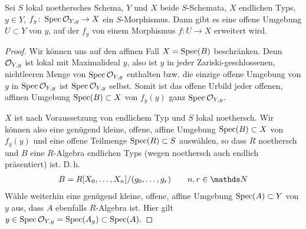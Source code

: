 \documentclass[german]{scrreprt}
\begin{document}
\begin{Lemma}\label{thm:morphismuserweiterung}
  Sei $S$ lokal noethersches Schema,
  $Y$ und $X$ beide $S$-Schemata,
  $X$ endlichen Typs,
  $y\in Y$,
  $f_y\colon \operatorname{Spec}\mathcal{O}_{Y,y}\to X$ ein $S$-Morphismus.
  Dann gibt es eine offene Umgebung $U\subset Y$ von $y$, auf der
  $f_y$ von einem Morphismus $f\colon U\to X$ erweitert wird.
  \begin{proof}
    Wir können uns auf den affinen Fall $X=\operatorname{Spec}(B)$ beschränken.
    Denn $\mathcal{O}_{Y,y}$ ist lokal mit Maximalideal $y$, also ist $y$ in
    jeder Zariski-geschlossenen, nichtleeren Menge von $\operatorname{Spec}\mathcal{O}_{Y,y}$
    enthalten bzw. die einzige offene Umgebung von $y$ in
    $\operatorname{Spec}\mathcal{O}_{Y,y}$ ist $\operatorname{Spec}\mathcal{O}_{Y,y}$ selbst.
    Somit ist das offene Urbild jeder offenen, affinen Umgebung
    $\operatorname{Spec}(B)\subset X$ von $f_y(y)$ ganz $\operatorname{Spec}\mathcal{O}_{Y,y}$.

    $X$ ist nach Voraussetzung von endlichem Typ und $S$ lokal
    noethersch.
    Wir können also eine genügend kleine, offene, affine Umgebung
    $\operatorname{Spec}(B)\subset X$ von $f_y(y)$ und eine offene Teilmenge
    $\operatorname{Spec}(R)\subset S$ auswählen,
    so dass $R$ noethersch und $B$ eine $R$-Algebra endlichen Typs
    (wegen noethersch auch endlich präsentiert) ist. D.\,h.
    \begin{gather*}
      B=R[X_0,\dotsc, X_n]/(g_0,\dotsc, g_r)\qquad n,r\in\N
    \end{gather*}
    Wähle weiterhin eine genügend kleine, offene, affine Umgebung
    $\operatorname{Spec}(A)\subset Y$ von $y$ aus, dass $A$ ebenfalls $R$-Algebra ist.
    Hier gilt $y\in\operatorname{Spec}\mathcal{O}_{Y,y}=\operatorname{Spec}(A_y)\subset\operatorname{Spec}(A)$.
    

\end{proof}
\end{Lemma}
\end{document}
